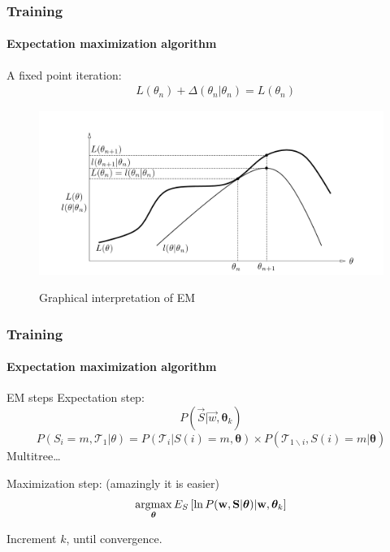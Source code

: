 \documentclass[12pt]{beamer}
\begin{document}
\begin{frame}
  \frametitle{Training}
  \framesubtitle{Expectation maximization algorithm}
  
  A fixed point iteration:
  \begin{align*}
    & L(\theta_n) + \Delta(\theta_n | \theta_n) = L(\theta_n)
  \end{align*}
  \begin{figure}[H]
  \centering
  \includegraphics[scale=0.7]{../figs/theory/em_graph_interpretation}
  \label{fig:em_graph_interpretation}
  \caption{Graphical interpretation of EM}
  \end{figure} 
\end{frame}

\begin{frame}
  \frametitle{Training}
  \framesubtitle{Expectation maximization algorithm}
  
  \begin{block}{EM steps}
    Expectation step:
    $$ P(\vec{S} | \vec{w}, \bm{\theta}_k) $$
    $$ P(S_i = m, \mathcal{T}_1 | \theta) = P(\mathcal{T}_i | S(i) = m, \bm{\theta})
    \times P(\mathcal{T}_{1 \backslash i}, S(i) = m | \bm{\theta})
    $$
    Multitree\ldots
    
    \pause
    Maximization step: (amazingly it is easier)
    $$ \operatorname*{argmax}\limits_{\bm{\theta}} E_S \left[ \ln P(\mathbf{w}, \mathbf{S} | \bm{\theta}) |
    \mathbf{w}, \bm{\theta}_k \right] $$
    
    \pause
    Increment $k$, until convergence.
  \end{block}
\end{frame}
\end{document}
